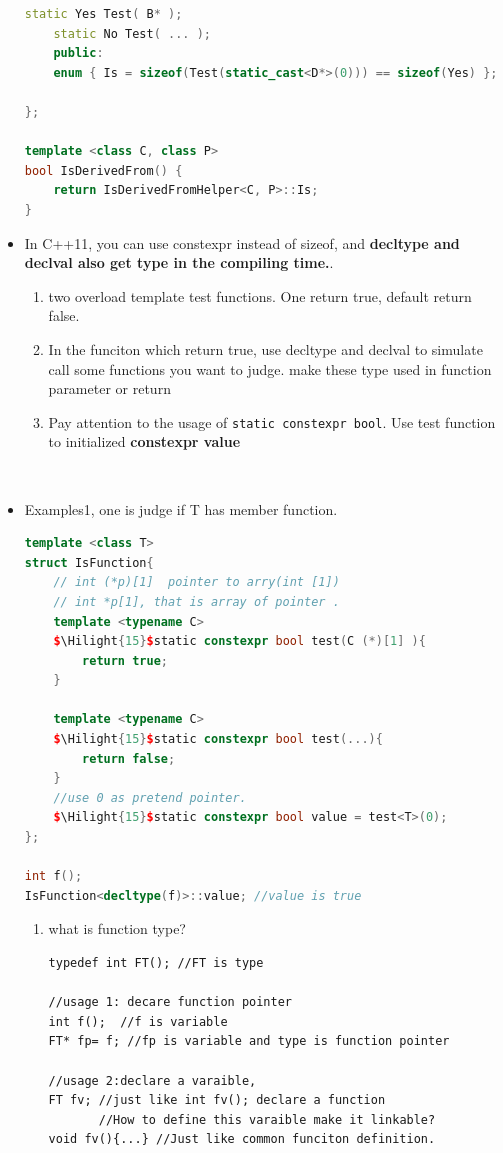 \documentclass[a4paper,11pt,twoside]{book}
\newcommand{\Hilight}[1]{\makebox[0pt][l]{\color{yellow}\rule[-3pt]{#1em}{11pt}}}
\newcommand{\Hilight}[1]{}
\begin{document}
\begin{itemize}
\begin{lstlisting}[frame=single, language=c++]
	static Yes Test( B* );
	static No Test( ... );
	public:
	enum { Is = sizeof(Test(static_cast<D*>(0))) == sizeof(Yes) };
	
};
	
template <class C, class P> 
bool IsDerivedFrom() {
	return IsDerivedFromHelper<C, P>::Is;
}
\end{lstlisting}
	
	\item In C++11, you can use constexpr instead of sizeof, and \textbf{decltype and declval also get type in the compiling time.}. 
	\begin{enumerate}
		\item two overload template test functions. One return true, default return false.
		
		\item In the funciton which return true, use decltype and declval to simulate call some functions you want to judge. make these type used in function parameter or return 
		
		\item Pay attention to the usage of \texttt{static constexpr bool}. Use test function to initialized \textbf{constexpr value} 
		
	\end{enumerate}
\
\item Examples1, one is judge if T has member function.

\begin{lstlisting}[frame=single, language=c++]
template <class T>
struct IsFunction{
	// int (*p)[1]  pointer to arry(int [1])
	// int *p[1], that is array of pointer .
	template <typename C> 
	$\Hilight{15}$static constexpr bool test(C (*)[1] ){
		return true;
	}
	
	template <typename C> 
	$\Hilight{15}$static constexpr bool test(...){
		return false;
	}
	//use 0 as pretend pointer.
	$\Hilight{15}$static constexpr bool value = test<T>(0);
};

int f();
IsFunction<decltype(f)>::value; //value is true 
\end{lstlisting}
\begin{enumerate}
	\item what is function type?
\begin{lstlisting}
typedef int FT(); //FT is type

//usage 1: decare function pointer
int f();  //f is variable
FT* fp= f; //fp is variable and type is function pointer

//usage 2:declare a varaible, 
FT fv; //just like int fv(); declare a function
       //How to define this varaible make it linkable?
void fv(){...} //Just like common funciton definition.
\end{lstlisting}


\end{enumerate}
\end{itemize}
\end{document}
